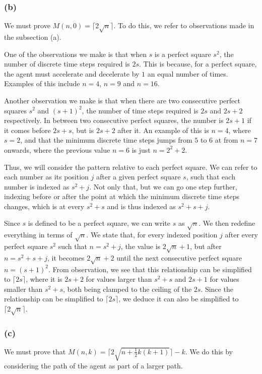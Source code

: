 \documentclass{article}
\begin{document}
\subsubsection*{(b)}
We must prove $M(n, 0) = \lceil 2 \sqrt{n} \rceil$. To do this, we refer to observations made in the subsection (a).

One of the observations we make is that when $s$ is a perfect square $s^2$, the number of discrete time steps required is $2s$. This is because, for a perfect square, the agent must accelerate and decelerate by $1$ an equal number of times. Examples of this include $n = 4$, $n = 9$ and $n = 16$.

Another observation we make is that when there are two consecutive perfect squares $s^2$ and $(s+1)^2$, the number of time steps required is $2s$ and $2s + 2$ respectively. In between two consecutive perfect squares, the number is $2s + 1$ if it comes before $2s + s$, but is $2s + 2$ after it. An example of this is $n = 4$, where $s = 2$, and that the minimum discrete time steps jumps from $5$ to $6$ at from $n = 7$ onwards, where the previous value $n = 6$ is just $n = 2^2 + 2$.

Thus, we will consider the pattern relative to each perfect square. We can refer to each number as its position $j$ after a given perfect square $s$, such that each number is indexed as $s^2 + j$. Not only that, but we can go one step further, indexing before or after the point at which the minimum discrete time steps changes, which is at every $s^2 + s$ and is thus indexed as $s^2 + s + j$.

Since $s$ is defined to be a perfect square, we can write $s$ as $\sqrt{n}$. We then redefine everything in terms of $\sqrt{n}$. We state that, for every indexed position $j$ after every perfect square $s^2$ such that $n = s^2 +j$, the value is $2\sqrt{n} + 1$, but after $n = s^2 + s + j$, it becomes $2\sqrt{n} + 2$ until the next consecutive perfect square $n = (s + 1)^2$. From observation, we see that this relationship can be simplified to $\lceil 2s \rceil$, where it is $2s + 2$ for values larger than $s^2 + s$ and $2s + 1$ for values smaller than $s^2 + s$, both being clamped to the ceiling of the $2s$. Since the relationship can be simplified to $\lceil 2s \rceil$, we deduce it can also be simplified to $\lceil 2\sqrt{n} \rceil$.

\subsubsection*{(c)}
We must prove that $M(n, k) = \lceil 2\sqrt{n + \frac{1}{2} k (k + 1)} \rceil - k$. We do this by considering the path of the agent as part of a larger path.
\end{document}
